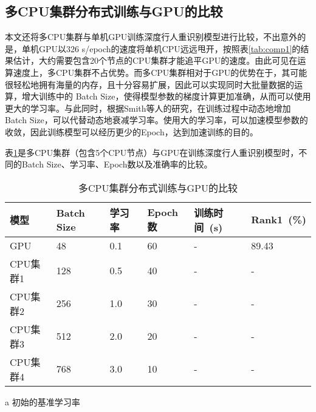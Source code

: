 \subsection{多CPU集群分布式训练与GPU的比较}

本文还将多CPU集群与单机GPU训练深度行人重识别模型进行比较，不出意外的是，单机GPU以326 s/epoch的速度将单机CPU远远甩开，按照表\ref{tab:comp1}的结果估计，大约需要包含20个节点的CPU集群才能追平GPU的速度。由此可见在运算速度上，多CPU集群不占优势。而多CPU集群相对于GPU的优势在于，其可能很轻松地拥有海量的内存，且十分容易扩展，因此可以实现同时大批量数据的运算，增大训练中的 Batch Size，使得模型参数的梯度计算更加准确，从而可以使用更大的学习率。与此同时，根据Smith等人\cite{smith2017don}的研究，在训练过程中动态地增加Batch Size，可以代替动态地衰减学习率。使用大的学习率，可以加速模型参数的收敛，因此训练模型可以经历更少的Epoch，达到加速训练的目的。

表\ref{tab:comp2}是多CPU集群（包含5个CPU节点）与GPU在训练深度行人重识别模型时，不同的Batch Size、学习率、Epoch数以及准确率的比较。

\begin{table}[h!]
    \centering
    \caption{多CPU集群分布式训练与GPU的比较}
    \label{tab:comp2}
    \begin{threeparttable}
    \begin{tabularx}{\textwidth}{X<{\centering}X<{\centering}X<{\centering}X<{\centering}X<{\centering}X<{\centering}}
    \toprule
    模型    & Batch Size & 学习率~\tnote{a} & Epoch数 & 训练时间~(s) & Rank1~(\%)  \\ \midrule
    GPU     & 48 & 0.1 & 60 & - & 89.43 \\
    CPU集群1 & 128 & 0.5 & 40 & - & - \\
    CPU集群2 & 256 & 1.0 & 30 & - & - \\
    CPU集群3 & 512 & 2.0 & 20 & - & - \\
    CPU集群4 & 768 & 3.0 & 10 & - & - \\ \bottomrule
    \end{tabularx}
    \begin{tablenotes}
        \footnotesize
        \item[a] 初始的基准学习率
    \end{tablenotes}
    \end{threeparttable}
\end{table}